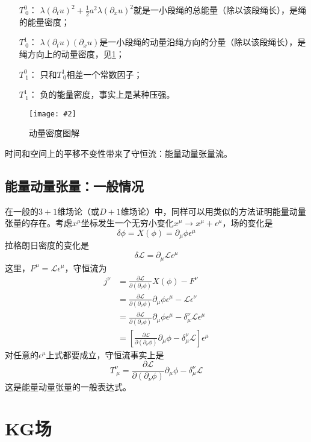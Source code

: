 \documentclass[a4paper,11pt]{ctexart}
\newcommand{\beq}{\begin{equation}}
\newcommand{\eeq}{\end{equation}}
\newcommand{\bea}{\begin{equation}\begin{aligned}}
\newcommand{\eea}{\end{aligned}\end{equation}}
\newcommand{\lag}{\mathcal{L}}
\newcommand{\cpic}[2]{
\begin{center}
\texttt{[image: \#2]}
\end{center}
}
\newcommand{\cpicn}[3]
{
\begin{figure}[h!]
\cpic{#1}{#2}
\caption{#3\label{#2}}
\end{figure}
}
\begin{document}
\begin{enumerate}
\item[$T^0_{\ 0}$：] $\lambda (\partial_t u)^2 + \frac{1}{2} a^2 \lambda (\partial_x u)^2$就是一小段绳的总能量（除以该段绳长），是绳的能量密度；
\item[$T^1_{\ 0}$：] $\lambda (\partial_t u)(\partial_x u)$是一小段绳的动量沿绳方向的分量（除以该段绳长），是绳方向上的动量密度，见\cref{p1}；
\item[$T^0_{\ 1}$：] 只和$T^1_{\ 0}$相差一个常数因子；
\item[$T^1_{\ 1}$：] 负的能量密度，事实上是某种压强。
\end{enumerate}
\cpicn{0.3}{p1}{动量密度图解}
\par
时间和空间上的平移不变性带来了守恒流：能量动量张量流。

\subsection{能量动量张量：一般情况}
在一般的$3+1$维场论（或$D+1$维场论）中，同样可以用类似的方法证明能量动量张量的存在。考虑$x^\mu$坐标发生一个无穷小变化$x^\mu \to x^\mu + \epsilon^\mu$，场的变化是
\beq
\delta \phi = X(\phi) = \partial_\mu \phi \epsilon^\mu
\eeq
拉格朗日密度的变化是
\beq
\delta \lag = \partial_\mu \lag \epsilon^\mu
\eeq
这里，$F^\mu = \lag \epsilon^\mu$，守恒流为
\bea
j^\nu &= \frac{\partial \lag}{\partial (\partial_\nu \phi)} X(\phi) - F^\nu \\
&= \frac{\partial \lag}{\partial (\partial_\nu \phi)}  \partial_\mu \phi \epsilon^\mu - \lag \epsilon^\nu \\
&= \frac{\partial \lag}{\partial (\partial_\nu \phi)}  \partial_\mu \phi \epsilon^\mu - \delta^\nu_\mu \lag \epsilon^\mu \\
& = [\frac{\partial \lag}{\partial (\partial_\nu \phi)}  \partial_\mu \phi - \delta^\nu_\mu \lag] \epsilon^\mu
\eea
对任意的$\epsilon^\mu$上式都要成立，守恒流事实上是
\beq
T^\nu_{\ \mu} = \frac{\partial \lag}{\partial (\partial_\nu \phi)}  \partial_\mu \phi - \delta^\nu_\mu \lag
\eeq
这是能量动量张量的一般表达式。

\section{KG场}
\end{document}
